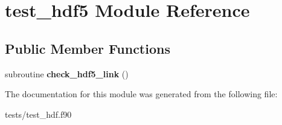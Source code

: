 \hypertarget{classtest__hdf5}{\section{test\-\_\-hdf5 Module Reference}
\label{classtest__hdf5}
}
\subsection*{Public Member Functions}
\begin{DoxyCompactItemize}
\item 
\hypertarget{classtest__hdf5_abd26bbb1d5eec743547ef60f9850e811}{subroutine {\bfseries check\-\_\-hdf5\-\_\-link} ()}\label{classtest__hdf5_abd26bbb1d5eec743547ef60f9850e811}

\end{DoxyCompactItemize}


The documentation for this module was generated from the following file\-:\begin{DoxyCompactItemize}
\item 
tests/test\-\_\-hdf.\-f90\end{DoxyCompactItemize}
